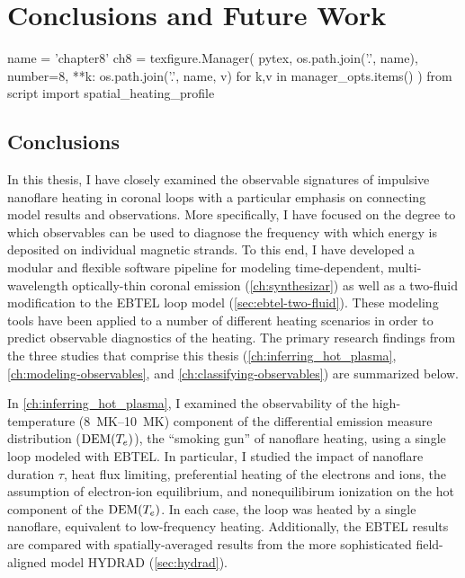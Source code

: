 \chapter{Conclusions and Future Work}\label{ch:conclusions}
\thispagestyle{firstpageofchapterstyle}

\begin{pycode}[chapter8]
name = 'chapter8'
ch8 = texfigure.Manager(
    pytex,
    os.path.join('.', name),
    number=8,
    **{k: os.path.join('.', name, v) for k,v in manager_opts.items()}
)
from script import spatial_heating_profile
\end{pycode}

\section{Conclusions}\label{sec:conclusions}

In this thesis, I have closely examined the observable signatures of impulsive nanoflare heating in \AR{} coronal loops with a particular emphasis on connecting model results and observations. More specifically, I have focused on the degree to which observables can be used to diagnose the frequency with which energy is deposited on individual magnetic strands. To this end, I have developed a modular and flexible software pipeline for modeling time-dependent, multi-wavelength optically-thin coronal emission (\autoref{ch:synthesizar}) as well as a two-fluid modification to the EBTEL loop model (\autoref{sec:ebtel-two-fluid}). These modeling tools have been applied to a number of different heating scenarios in order to predict observable diagnostics of the heating. The primary research findings from the three studies that comprise this thesis (\autoref{ch:inferring_hot_plasma}, \autoref{ch:modeling-observables}, and \autoref{ch:classifying-observables}) are summarized below.

In \autoref{ch:inferring_hot_plasma}, I examined the observability of the high-temperature (\SIrange{8}{10}{\mega\kelvin}) component of the differential emission measure distribution ($\textup{DEM}(T_e)$), the ``smoking gun'' of nanoflare heating, using a single loop modeled with EBTEL. In particular, I studied the impact of nanoflare duration $\tau$, heat flux limiting, preferential heating of the electrons and ions, the assumption of electron-ion equilibrium, and nonequilibirum ionization on the hot component of the $\textup{DEM}(T_e)$. In each case, the loop was heated by a single nanoflare, equivalent to low-frequency heating. Additionally, the EBTEL results are compared with spatially-averaged results from the more sophisticated field-aligned model HYDRAD (\autoref{sec:hydrad}).

